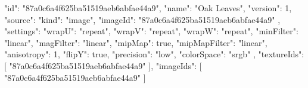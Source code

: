 {
  "id": "87a0c6a4f625ba51519aeb6abfae44a9",
  "name": "Oak Leaves",
  "version": 1,
  "source": {
    "kind": "image",
    "imageId": "87a0c6a4f625ba51519aeb6abfae44a9"
  },
  "settings": {
    "wrapU": "repeat",
    "wrapV": "repeat",
    "wrapW": "repeat",
    "minFilter": "linear",
    "magFilter": "linear",
    "mipMap": true,
    "mipMapFilter": "linear",
    "anisotropy": 1,
    "flipY": true,
    "precision": "low",
    "colorSpace": "srgb"
  },
  "textureIds": [
    "87a0c6a4f625ba51519aeb6abfae44a9"
  ],
  "imageIds": [
    "87a0c6a4f625ba51519aeb6abfae44a9"
  ]
}
